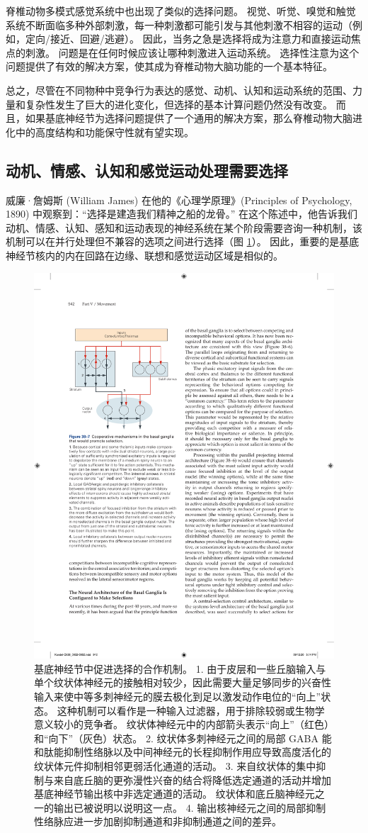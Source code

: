 脊椎动物多模式感觉系统中也出现了类似的选择问题。 视觉、听觉、嗅觉和触觉系统不断面临多种外部刺激，每一种刺激都可能引发与其他刺激不相容的运动（例如，定向/接近、回避/逃避）。 因此，当务之急是选择将成为注意力和直接运动焦点的刺激。 问题是在任何时候应该让哪种刺激进入运动系统。 选择性注意为这个问题提供了有效的解决方案，使其成为脊椎动物大脑功能的一个基本特征。

总之，尽管在不同物种中竞争行为表达的感觉、动机、认知和运动系统的范围、力量和复杂性发生了巨大的进化变化，但选择的基本计算问题仍然没有改变。 而且，如果基底神经节为选择问题提供了一个通用的解决方案，那么脊椎动物大脑进化中的高度结构和功能保守性就有望实现。

\subsection{动机、情感、认知和感觉运动处理需要选择}
威廉·詹姆斯 (William James) 在他的《心理学原理》(Principles of Psychology, 1890) 中观察到：“选择是建造我们精神之船的龙骨。” 
在这个陈述中，他告诉我们动机、情感、认知、感知和运动表现的神经系统在某个阶段需要咨询一种机制，该机制可以在并行处理但不兼容的选项之间进行选择（图 \ref{fig:38_7}）。 
因此，重要的是基底神经节核内的内在回路在边缘、联想和感觉运动区域是相似的。

\begin{figure}[htbp]
	\centering
	\includegraphics[width=0.5\linewidth]{chap38/fig_38_7}
	\caption{基底神经节中促进选择的合作机制。 1. 由于皮层和一些丘脑输入与单个纹状体神经元的接触相对较少，因此需要大量足够同步的兴奋性输入来使中等多刺神经元的膜去极化到足以激发动作电位的“向上”状态。 这种机制可以看作是一种输入过滤器，用于排除较弱或生物学意义较小的竞争者。 纹状体神经元中的内部箭头表示“向上”（红色）和“向下”（灰色）状态。 2. 纹状体多刺神经元之间的局部 GABA 能和肽能抑制性络脉以及中间神经元的长程抑制作用应导致高度活化的纹状体元件抑制相邻更弱活化通道的活动。 3. 来自纹状体的集中抑制与来自底丘脑的更弥漫性兴奋的结合将降低选定通道的活动并增加基底神经节输出核中非选定通道的活动。 纹状体和底丘脑神经元之一的输出已被说明以说明这一点。 4. 输出核神经元之间的局部抑制性络脉应进一步加剧抑制通道和非抑制通道之间的差异。}
	\label{fig:38_7}
\end{figure}

